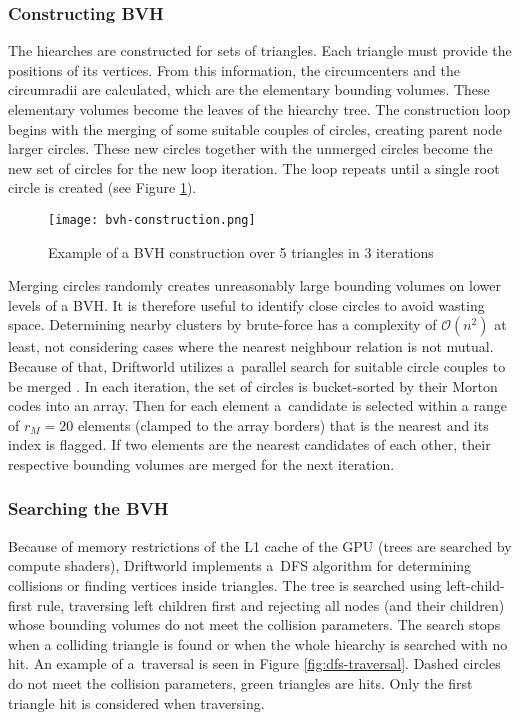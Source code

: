 \subsubsection{Constructing BVH}
The hiearches are constructed for sets of triangles. Each triangle must provide the positions of its vertices. From this information, the circumcenters and the circumradii are calculated, which are the elementary bounding volumes. These elementary volumes become the leaves of the hiearchy tree. The construction loop begins with the merging of some suitable couples of circles, creating parent node larger circles. These new circles together with the unmerged circles become the new set of circles for the new loop iteration. The loop repeats until a single root circle is created (see Figure \ref{fig:bvh-construction}).
\begin{figure}[ht]
\centering
\texttt{[image: bvh-construction.png]}
\caption{Example of a BVH construction over 5 triangles in 3 iterations}
\label{fig:bvh-construction}
\end{figure}

Merging circles randomly creates unreasonably large bounding volumes on lower levels of a BVH. It is therefore useful to identify close circles to avoid wasting space. Determining nearby clusters by brute-force has a complexity of $\mathcal{O}(n^2)$ at least, not considering cases where the nearest neighbour relation is not mutual. Because of that, Driftworld utilizes a~parallel search for suitable circle couples to be merged \cite{meister}. In each iteration, the set of circles is bucket-sorted by their Morton codes into an array. Then for each element a~candidate is selected within a range of $r_M=20$ elements (clamped to the array borders) that is the nearest and its index is flagged. If two elements are the nearest candidates of each other, their respective bounding volumes are merged for the next iteration.
\subsubsection{Searching the BVH}
Because of memory restrictions of the L1 cache of the GPU (trees are searched by compute shaders), Driftworld implements a~DFS algorithm for determining collisions or finding vertices inside triangles. The tree is searched using left-child-first rule, traversing left children first and rejecting all nodes (and their children) whose bounding volumes do not meet the collision parameters. The search stops when a colliding triangle is found or when the whole hiearchy is searched with no hit. An example of a~traversal is seen in Figure \ref{fig:dfs-traversal}. Dashed circles do not meet the collision parameters, green triangles are hits. Only the first triangle hit is considered when traversing.

